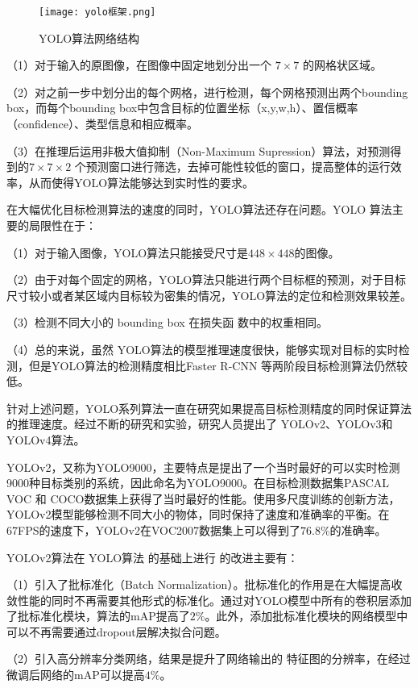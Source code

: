 \begin{figure}[htbp]
    \centering
    \texttt{[image: yolo框架.png]}
    \caption{YOLO算法网络结构\cite{redmon2016you}}
    \label{yk}
\end{figure}

（1）对于输入的原图像，在图像中固定地划分出一个 $7 \times 7$ 的网格状区域。

（2）对之前一步中划分出的每个网格，进行检测，每个网格预测出两个bounding box，而每个bounding box中包含目标的位置坐标（x,y,w,h）、置信概率（confidence）、类型信息和相应概率。

（3）在推理后运用非极大值抑制（Non-Maximum Supression）算法，对预测得到的$7 \times 7 \times 2$ 个预测窗口进行筛选，去掉可能性较低的窗口，提高整体的运行效率，从而使得YOLO算法能够达到实时性的要求。

在大幅优化目标检测算法的速度的同时，YOLO算法还存在问题。YOLO 算法主要的局限性在于：

（1）对于输入图像，YOLO算法只能接受尺寸是$448 \times 448$的图像。

（2）由于对每个固定的网格，YOLO算法只能进行两个目标框的预测，对于目标尺寸较小或者某区域内目标较为密集的情况，YOLO算法的定位和检测效果较差。

（3）检测不同大小的 bounding box 在损失函
数中的权重相同。

（4）总的来说，虽然 YOLO算法的模型推理速度很快，能够实现对目标的实时检测，但是YOLO算法的检测精度相比Faster R-CNN 等两阶段目标检测算法仍然较低。

针对上述问题，YOLO系列算法一直在研究如果提高目标检测精度的同时保证算法的推理速度。经过不断的研究和实验，研究人员提出了 YOLOv2\cite{redmon2017yolo9000}、YOLOv3\cite{redmon2018yolov3}和YOLOv4\cite{AlexeyBochkovskiy2020YOLOv4OS}算法。

YOLOv2，又称为YOLO9000，主要特点是提出了一个当时最好的可以实时检测9000种目标类别的系统，因此命名为YOLO9000。在目标检测数据集PASCAL VOC 和 COCO数据集上获得了当时最好的性能。使用多尺度训练的创新方法，YOLOv2模型能够检测不同大小的物体，同时保持了速度和准确率的平衡。在67FPS的速度下，YOLOv2在VOC2007数据集上可以得到了$76.8\%$的准确率。

YOLOv2算法在 YOLO算法 的基础上进行
的改进主要有：

（1）引入了批标准化（Batch Normalization）。批标准化的作用是在大幅提高收敛性能的同时不再需要其他形式的标准化。通过对YOLO模型中所有的卷积层添加了批标准化模块，算法的mAP提高了$2\%$。此外，添加批标准化模块的网络模型中可以不再需要通过dropout层解决拟合问题。

（2）引入高分辨率分类网络，结果是提升了网络输出的 特征图的分辨率，在经过微调后网络的mAP可以提高$4\%$。

